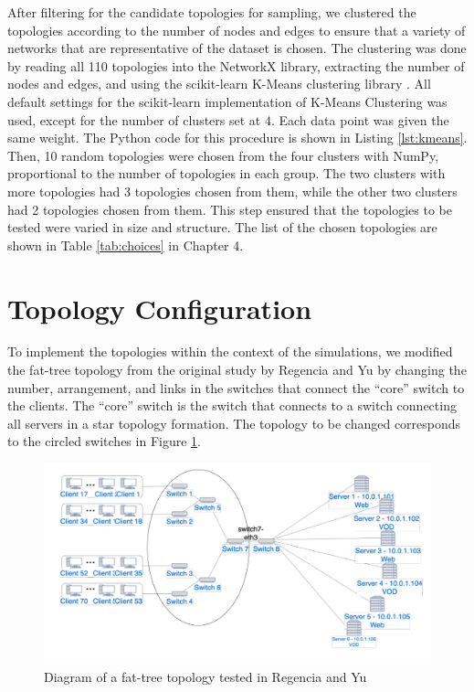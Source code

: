 After filtering for the candidate topologies for sampling, we clustered the topologies according to the number of nodes and edges to ensure that a variety of networks that are representative of the dataset is chosen. The clustering was done by reading all 110 topologies into the NetworkX library, extracting the number of nodes and edges, and using the scikit-learn K-Means clustering library \cite{pedregosa_scikit-learn_2011}. All default settings for the scikit-learn implementation of K-Means Clustering was used, except for the number of clusters set at $4$. Each data point was given the same weight. The Python code for this procedure is shown in Listing \ref{lst:kmeans}. Then, 10 random topologies were chosen from the four clusters with NumPy, proportional to the number of topologies in each group. The two clusters with more topologies had 3 topologies chosen from them, while the other two clusters had 2 topologies chosen from them. This step ensured that the topologies to be tested were varied in size and structure. The list of the chosen topologies are shown in Table \ref{tab:choices} in Chapter 4.

\section{Topology Configuration} \label{sec:topo_config}
To implement the topologies within the context of the simulations, we modified the fat-tree topology from the original study by Regencia and Yu by changing the number, arrangement, and links in the switches that connect the ``core'' switch to the clients. The ``core'' switch is the switch that connects to a switch connecting all servers in a star topology formation. The topology to be changed corresponds to the circled switches in Figure \ref{fig:original_topology}.

\begin{figure}[htbp]
    \centering
    \includegraphics[width=\textwidth]{Figures/original_topology.png}
    \caption{Diagram of a fat-tree topology tested in Regencia and Yu}
    \label{fig:original_topology}
\end{figure}

